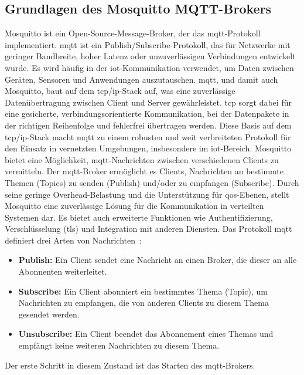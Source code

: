
\subsection{Grundlagen des Mosquitto MQTT-Brokers}\label{subsec:mosquitto-mqtt}
Mosquitto ist ein Open-Source-Message-Broker, der das \gls{mqtt}-Protokoll implementiert.
\gls{mqtt} ist ein Publish/Subscribe-Protokoll, das für Netzwerke mit geringer Bandbreite,
hoher Latenz oder unzuverlässigen Verbindungen entwickelt wurde.
Es wird häufig in der \gls{iot}-Kommunikation verwendet, um Daten zwischen Geräten, Sensoren und Anwendungen auszutauschen.
\gls{mqtt}, und damit auch Mosquitto, baut auf dem \gls{tcp}/\gls{ip}-Stack auf, was eine zuverlässige Datenübertragung zwischen Client und
Server gewährleistet.
\gls{tcp} sorgt dabei für eine gesicherte, verbindungsorientierte Kommunikation, bei der Datenpakete in der richtigen
Reihenfolge und fehlerfrei übertragen werden.
Diese Basis auf dem \gls{tcp}/\gls{ip}-Stack macht \gls{mqtt} zu einem robusten und weit verbreiteten Protokoll für den Einsatz
in vernetzten Umgebungen, insbesondere im \gls{iot}-Bereich.
Mosquitto bietet eine Möglichkeit, \gls{mqtt}-Nachrichten zwischen verschiedenen Clients zu vermitteln.
Der \gls{mqtt}-Broker ermöglicht es Clients, Nachrichten an bestimmte Themen (Topics) zu senden (Publish) und/oder zu
empfangen (Subscribe).
Durch seine geringe Overhead-Belastung und die Unterstützung für \gls{qos}-Ebenen, stellt Mosquitto eine zuverlässige
Lösung für die Kommunikation in verteilten Systemen dar.
Es bietet auch erweiterte Funktionen wie Authentifizierung, Verschlüsselung (\gls{tls}) und Integration mit anderen
Diensten.\newline
Das Protokoll \gls{mqtt} definiert drei Arten von Nachrichten~\cite{mqtt}:
\begin{itemize}
    \item \textbf{Publish:} Ein Client sendet eine Nachricht an einen Broker, die dieser an alle Abonnenten weiterleitet.
    \item \textbf{Subscribe:} Ein Client abonniert ein bestimmtes Thema (Topic), um Nachrichten zu empfangen, die von anderen
          Clients zu diesem Thema gesendet werden.
    \item \textbf{Unsubscribe:} Ein Client beendet das Abonnement eines Themas und empfängt keine weiteren Nachrichten zu
          diesem Thema.
\end{itemize}
Der erste Schritt in diesem Zustand ist das Starten des \gls{mqtt}-Brokers.
